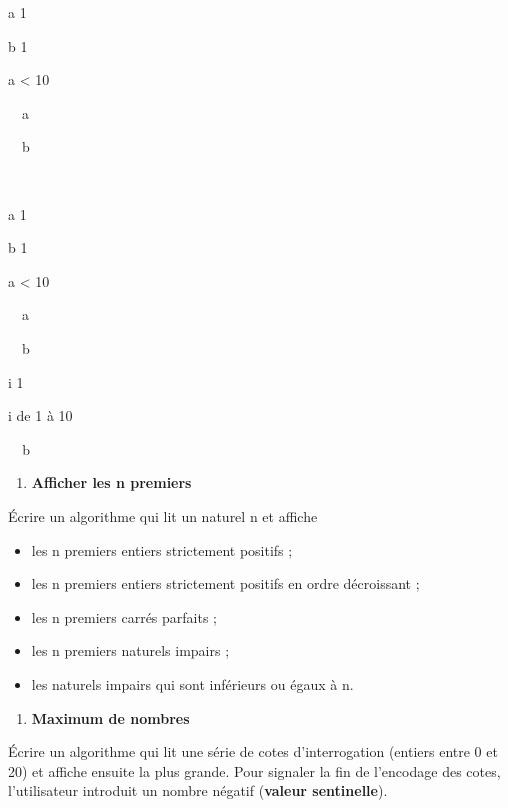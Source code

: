 {\sffamily
a  1}

{\sffamily
b  1}

{\sffamily
{} a {\textless} 10 }

{\sffamily
\ \ {a
}}

{\sffamily
{\ \ b
}}

{\sffamily
{\ \ }}

{\sffamily
{}}


\bigskip

{\sffamily
a  1}

{\sffamily
b  1}

{\sffamily
{} a {\textless} 10 }

{\sffamily
\ \ {a
}}

{\sffamily
{\ \ b
}}

{\sffamily
{}}

{\sffamily
{}}


\bigskip

{\sffamily
i  1}

{\sffamily
{} i de 1 à 10 }

{\sffamily
{\texttt{\ \ }}{b}{\texttt{
}}}

{\sffamily
{}}


\bigskip

\liststyleExercice
\setcounter{saveenum}{\value{enumi}}
\begin{enumerate}
\setcounter{enumi}{\value{saveenum}}
\item {\sffamily\bfseries
Afficher les n premiers}
\end{enumerate}
{
Écrire un algorithme qui lit un naturel n et affiche}

\begin{itemize}
\item {
les n premiers entiers strictement positifs ;}
\item {
les n premiers entiers strictement positifs en ordre décroissant ;}
\item {
les n premiers carrés parfaits ;}
\item {
les n premiers naturels impairs ;}
\item {
les naturels impairs qui sont inférieurs ou égaux à n.}
\end{itemize}
\liststyleExercice
\begin{enumerate}
\item {\sffamily\bfseries
Maximum de nombres}
\end{enumerate}
{
Écrire un algorithme qui lit une série de cotes d’interrogation (entiers
entre 0 et 20) et affiche ensuite la plus grande. Pour signaler la fin
de l’encodage des cotes, l’utilisateur introduit un nombre négatif
(\textbf{valeur sentinelle}).}

